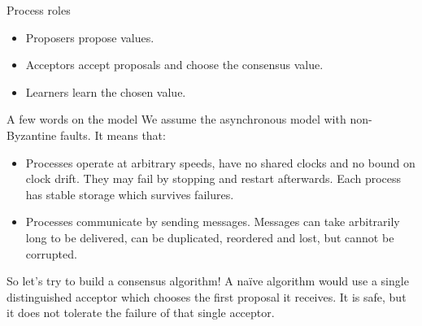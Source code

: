 \documentclass{beamer}
\begin{document}
\begin{frame}{Process roles}
  \begin{itemize}
    \item Proposers propose values.
    \item Acceptors accept proposals and choose the consensus value.
    \item Learners learn the chosen value.
  \end{itemize}
\end{frame}

\begin{frame}{A few words on the model}
  We assume the \alert{asynchronous} model with \alert{non-Byzantine} faults. It means that:
  \begin{itemize}
    \item Processes operate at arbitrary speeds, have no shared clocks and no bound on clock drift. They may fail by stopping and restart afterwards. Each process has stable storage which survives failures.
    \item Processes communicate by sending messages. Messages can take arbitrarily long to be delivered, can be duplicated, reordered and lost, but \alert{cannot be corrupted}.
  \end{itemize}
\end{frame}

\begin{frame}{So let's try to build a consensus algorithm!}
  A na\"ive algorithm would use a single distinguished acceptor which chooses the first proposal it receives. It is safe, but it does not tolerate the failure of that single acceptor.
  \begin{figure}[!h]
  \centering
  \end{figure}
\end{frame}

\newtheorem{invariant}[theorem]{Invariant}
\end{document}
